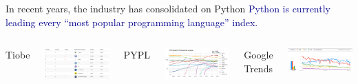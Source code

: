 \documentclass[aspectratio=169]{beamer}
\begin{document}
\begin{frame}{In recent years, the industry has consolidated on Python}
\large
\vspace{0.25 cm}
\textcolor{darkblue}{Python is currently leading every ``most popular programming language'' index.}

\vspace{0.25 cm}
\begin{columns}[t]
\centering Tiobe

\vspace{0.1 cm}
\includegraphics[width=\linewidth]{PLOTS/python-rankings-tiobe-2022.png}

\centering PYPL

\vspace{0.1 cm}
\includegraphics[width=\linewidth]{PLOTS/python-rankings-pypl-2022.png}

\centering Google Trends

\vspace{0.1 cm}
\includegraphics[width=\linewidth]{PLOTS/python-rankings-googletrends-2022.png}
\end{columns}


\end{frame}
\end{document}
